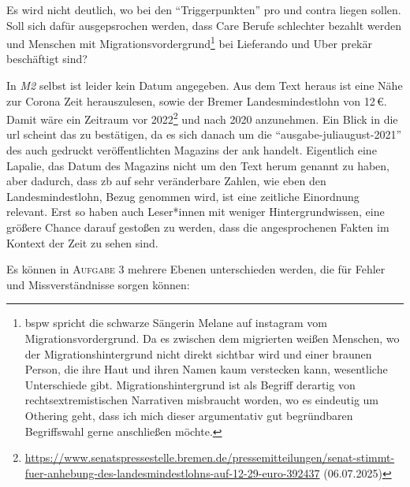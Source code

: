 Es wird nicht deutlich, wo bei den \enquote{Triggerpunkten} pro und contra liegen sollen. Soll sich dafür ausgepsrochen werden, dass Care Berufe schlechter bezahlt werden und Menschen mit Migrationsvordergrund\footnote{
    \Gls{bspw} spricht die schwarze Sängerin Melane auf instagram vom Migrationsvordergrund. Da es zwischen dem migrierten weißen Menschen, wo der Migrationshintergrund nicht direkt sichtbar wird und einer braunen Person, die ihre Haut und ihren Namen kaum verstecken kann, wesentliche Unterschiede gibt. Migrationshintergrund ist als Begriff derartig von rechtsextremistischen Narrativen misbraucht worden, wo es eindeutig um Othering geht, dass ich mich dieser argumentativ gut begründbaren Begriffswahl gerne anschließen möchte.  
} bei Lieferando und Uber prekär beschäftigt sind? 

In \emph{M2} selbst ist leider kein Datum angegeben. Aus dem Text heraus ist eine Nähe zur Corona Zeit herauszulesen, sowie der Bremer Landesmindestlohn von 12\,€. Damit wäre ein Zeitraum vor 2022\footnote{
    \url{https://www.senatspressestelle.bremen.de/pressemitteilungen/senat-stimmt-fuer-anhebung-des-landesmindestlohns-auf-12-29-euro-392437} (06.07.2025)
} und nach 2020 anzunehmen. Ein Blick in die \gls{url} scheint das zu bestätigen, da es sich danach um die \enquote{ausgabe-juliaugust-2021} des auch gedruckt veröffentlichten Magazins der \gls{ank} handelt. Eigentlich eine Lapalie, das Datum des Magazins nicht um den Text herum genannt zu haben, aber dadurch, dass \gls{zb} auf sehr veränderbare Zahlen, wie eben den Landesmindestlohn, Bezug genommen wird, ist eine zeitliche Einordnung relevant. Erst so haben auch Leser*innen mit weniger Hintergrundwissen, eine größere Chance darauf gestoßen zu werden, dass die angesprochenen Fakten im Kontext der Zeit zu sehen sind. 



Es können in \textsc{Aufgabe 3} mehrere Ebenen unterschieden werden, die für Fehler und Missverständnisse sorgen können:

